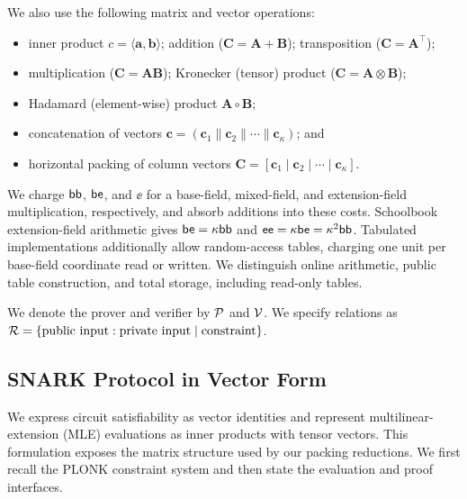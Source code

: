 We also use the following matrix and vector operations:
\begin{itemize}[noitemsep, topsep = 0pt]
\item inner product $c = \langle \bm a, \bm b \rangle$; addition ($\bm C = \bm A + \bm B$); transposition ($\bm C = \bm A^\top$);
\item multiplication
($\bm C = \bm A\bm B$); Kronecker (tensor) product ($\bm C = \bm A \otimes \bm B$);
\item Hadamard (element-wise) product $\bm{A} \circ \bm{B}$;
\item concatenation of vectors $\bm{c} = (\bm c_1 \| \bm c_2 \|\cdots \| \bm c_\kappa)$; and
\item horizontal packing of column vectors $\bm C = [\bm c_1 \mid \bm c_2 \mid \cdots \mid \bm c_\kappa]$.
\end{itemize}
    
We charge \(\mathsf{bb}\), \(\mathsf{be}\), and \(\ee\) for a base-field,
mixed-field, and extension-field multiplication, respectively,
and absorb additions into these costs. Schoolbook extension-field
arithmetic gives
\(
    \mathsf{be}=\kappa\mathsf{bb}
\) and
\(
    \mathsf{ee}=\kappa\mathsf{be}=\kappa^2\mathsf{bb}
\).
Tabulated implementations additionally allow random-access tables,
charging one unit per base-field coordinate read or written.
We distinguish online arithmetic, public table construction,
and total storage, including read-only tables.


We denote the prover and verifier by $\mathcal{P}$ and $\mathcal{V}$.
We specify relations as
$\mathcal{R}=\{\text{public input}:\text{private input}\mid\text{constraint}\}$.

\subsection{SNARK Protocol in Vector Form}
\label{sec:defgeneral}
We express circuit satisfiability as vector identities and represent
multilinear-extension (MLE) evaluations as inner products with
tensor vectors. This formulation exposes the matrix structure used
by our packing reductions. We first recall the PLONK constraint
system and then state the evaluation and proof interfaces.

